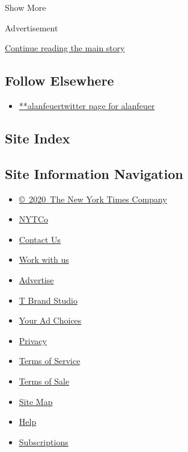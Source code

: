 Show More

Advertisement

\protect\hyperlink{after-mid2}{Continue reading the main story}

\hypertarget{follow-elsewhere}{%
\subsection{Follow Elsewhere}\label{follow-elsewhere}}

\begin{itemize}
\tightlist
\item
  \href{https://twitter.com/alanfeuer}{**alanfeuertwitter page for
  alanfeuer}
\end{itemize}

\hypertarget{site-index}{%
\subsection{Site Index}\label{site-index}}

\hypertarget{site-information-navigation}{%
\subsection{Site Information
Navigation}\label{site-information-navigation}}

\begin{itemize}
\tightlist
\item
  \href{https://help.nytimes.com/hc/en-us/articles/115014792127-Copyright-notice}{©~2020~The
  New York Times Company}
\end{itemize}

\begin{itemize}
\tightlist
\item
  \href{https://www.nytco.com/}{NYTCo}
\item
  \href{https://help.nytimes.com/hc/en-us/articles/115015385887-Contact-Us}{Contact
  Us}
\item
  \href{https://www.nytco.com/careers/}{Work with us}
\item
  \href{https://nytmediakit.com/}{Advertise}
\item
  \href{http://www.tbrandstudio.com/}{T Brand Studio}
\item
  \href{https://www.nytimes.com/privacy/cookie-policy\#how-do-i-manage-trackers}{Your
  Ad Choices}
\item
  \href{https://www.nytimes.com/privacy}{Privacy}
\item
  \href{https://help.nytimes.com/hc/en-us/articles/115014893428-Terms-of-service}{Terms
  of Service}
\item
  \href{https://help.nytimes.com/hc/en-us/articles/115014893968-Terms-of-sale}{Terms
  of Sale}
\item
  \href{https://spiderbites.nytimes.com}{Site Map}
\item
  \href{https://help.nytimes.com/hc/en-us}{Help}
\item
  \href{https://www.nytimes.com/subscription?campaignId=37WXW}{Subscriptions}
\end{itemize}
